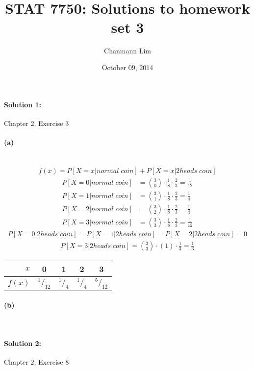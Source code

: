 \documentclass[a4paper]{article}
\begin{document}
\title{STAT 7750: Solutions to homework set 3}
\author{Chanmann Lim}
\date{October 09, 2014}
\maketitle

\paragraph{Solution 1:}
Chapter 2, Exercise 3

\paragraph{(a)} ~\\
\begin{align*}
f(x) = P[X=x|normal\;coin] + P[X=x|2heads\;coin]
\end{align*}
\begin{align*}
P[X=0|normal\;coin] &= {3 \choose 0} \cdot \frac{1}{8} \cdot \frac{2}{3} = \frac{1}{12}\\
P[X=1|normal\;coin] &= {3 \choose 1} \cdot \frac{1}{8} \cdot \frac{2}{3} = \frac{1}{4}\\
P[X=2|normal\;coin] &= {3 \choose 2} \cdot \frac{1}{8} \cdot \frac{2}{3} = \frac{1}{4}\\
P[X=3|normal\;coin] &= {3 \choose 3} \cdot \frac{1}{8} \cdot \frac{2}{3} = \frac{1}{12}
\end{align*}
\begin{align*}
P[X=0|2heads\;coin] = P[X=1|2heads\;coin] = P[X=2|2heads\;coin] = 0
\end{align*}
\begin{align*}
P[X=3|2heads\;coin] = {3 \choose 3} \cdot (1) \cdot \frac{1}{3} = \frac{1}{3}
\end{align*}

\begin{tabular}{r | c c c c}
$x$ & 0 & 1 & 2 & 3 \\
\hline
$f(x)$ & $^1/_{12}$ & $^1/_4$ & $^1/_4$ & $^{5}/_{12}$
\end{tabular}

\paragraph{(b)} ~\\
\vspace{2 cm}

\paragraph{Solution 2:}
Chapter 2, Exercise 8
\end{document}
